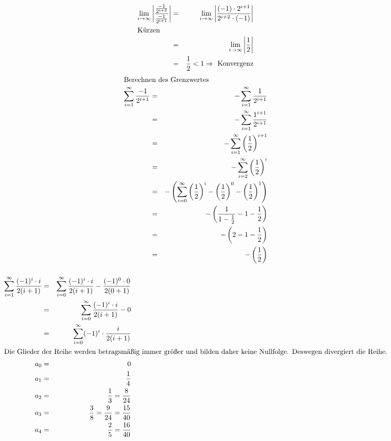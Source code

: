 \documentclass[10pt,a4paper,oneside,ngerman,numbers=noenddot]{scrartcl}
\begin{document}
\subsubsection{} %
\begin{alignat*}{2}
\lim\limits_{i \rightarrow \infty} \left|\frac{\frac{-1}{2^{i+2}}}{\frac{-1}{2^{i+1}}} \right| &=& \lim\limits_{i \rightarrow \infty} \left|\frac{(-1) \cdot 2^{i+1}}{2^{i+2} \cdot (-1)} \right| \\
\intertext{Kürzen}
&=& \lim\limits_{i \rightarrow \infty} \left|\frac{1}{2} \right| \\
&=& \frac{1}{2} < 1 \Rightarrow \text{ Konvergenz}
\end{alignat*}
\begin{alignat*}{2}
\intertext{Berechnen des Grenzwertes}
\sum\limits_{i=1}^{\infty} \frac{-1}{2^{i+1}} &=& - \sum\limits_{i=1}^{\infty} \frac{1}{2^{i+1}} \\
&=& - \sum\limits_{i=1}^{\infty} \frac{1^{i+1}}{2^{i+1}} \\
&=& - \sum\limits_{i=1}^{\infty} \left(\frac{1}{2}\right)^{i+1} \\
&=& - \sum\limits_{i=2}^{\infty} \left(\frac{1}{2}\right)^{i} \\
&=& -\left( \sum\limits_{i=0}^{\infty} \left(\frac{1}{2}\right)^{i} - \left(\frac{1}{2}\right)^{0} - \left(\frac{1}{2}\right)^{1} \right) \\
&=& -\left( \frac{1}{1 - \frac{1}{2}} - 1 - \frac{1}{2} \right) \\
&=& -\left( 2 - 1 - \frac{1}{2} \right) \\
&=& -\left( \frac{1}{2} \right)
\end{alignat*}
\subsubsection{} %
\begin{alignat*}{2}
\sum\limits_{i=1}^{\infty} \frac{(-1)^{i} \cdot i}{2(i+1)} &=& \sum\limits_{i=0}^{\infty} \frac{(-1)^{i} \cdot i}{2(i+1)} - \frac{(-1)^{0} \cdot 0}{2(0+1)} \\
&=& \sum\limits_{i=0}^{\infty} \frac{(-1)^{i} \cdot i}{2(i+1)} - 0 \\
&=& \sum\limits_{i=0}^{\infty} (-1)^{i} \cdot \frac{i}{2(i+1)} \\
\intertext{Die Glieder der Reihe werden betragsmäßig immer größer und bilden daher keine Nullfolge. Deswegen divergiert die Reihe.}
a_{0} &=& 0 \\
a_{1} &=& \frac{1}{4} \\
a_{2} &=& \frac{1}{3} = \frac{8}{24} \\
a_{3} &=& \frac{3}{8} = \frac{9}{24} = \frac{15}{40}\\
a_{4} &=& \frac{2}{5} = \frac{16}{40}
\end{alignat*}
\end{document}
